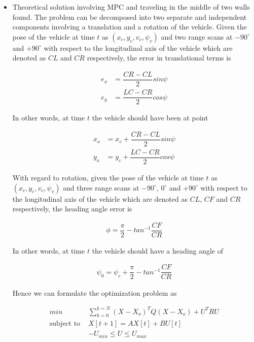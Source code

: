 \documentclass[oneside,12pt]{article}
\begin{document}
\begin{itemize}
  \item Theoretical solution involving MPC and traveling in the middle of two
    walls found. The problem can be decomposed into two separate and independent
    components involving a translation and a rotation of the vehicle. Given the
    pose of the vehicle at time $t$ as $(x_c, y_c, v_c, \psi_v)$ and two range
    scans at $-90^\circ$ and $+90^\circ$ with respect to the longitudinal axis of
    the vehicle which are denoted as $CL$ and $CR$ respectively, the error in
    translational terms is

    \begin{align}
      e_x &= \dfrac{CR-CL}{2}sin\psi \\
      e_y &= \dfrac{LC-CR}{2}cos\psi
    \end{align}

    In other words, at time $t$ the vehicle should have been at point

    \begin{align}
      x_o &=x_c + \dfrac{CR-CL}{2}sin\psi \\
      y_o &=y_c + \dfrac{LC-CR}{2}cos\psi
    \end{align}

    With regard to rotation, given the pose of the vehicle at time $t$ as
    $(x_c, y_c, v_c, \psi_v)$ and three range scans at $-90^\circ$, $0^\circ$ and
    $+90^\circ$ with respect to the longitudinal axis of the vehicle which are
    denoted as $CL$, $CF$ and $CR$ respectively, the heading angle error is

    \begin{align}
      \phi = \dfrac{\pi}{2} - tan^{-1}\dfrac{CF}{CR}
    \end{align}

    In other words, at time $t$ the vehicle should have a heading angle of

    \begin{align}
      \psi_0 = \psi_c + \dfrac{\pi}{2} - tan^{-1}\dfrac{CF}{CR}
    \end{align}

    Hence we can formulate the optimization problem as

    \begin{align}
      min &\sum\limits_{k=0}^{k=N} (X-X_o)^T Q (X-X_o) + U^T R U \\
      \text{subject to } & X[t+1] = A X[t] + B U[t] \\
      & -U_{min} \leq U \leq U_{max}
    \end{align}


\end{itemize}
\end{document}
